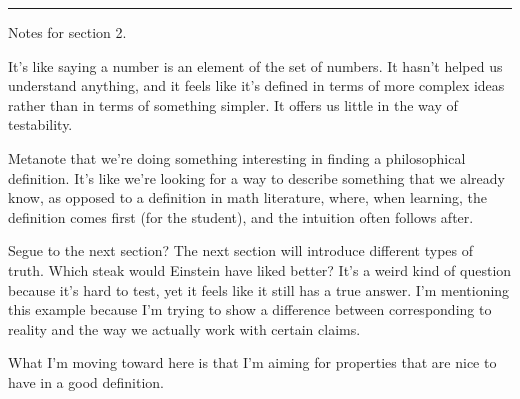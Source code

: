 \documentclass[11pt, oneside]{article}   	%
\newcommand\hr{\bigskip\hrule\bigskip}
\begin{document}

%
%

\hr

Notes for section 2.

It's like saying a number is an element of the set of numbers.
It hasn't helped us understand anything, and it feels like it's
defined in terms of more complex ideas rather than in terms of
something simpler. It offers us little in the way of testability.

Metanote that we're doing something interesting in finding a philosophical
definition. It's like we're looking for a way to describe something that
we already know, as opposed to a definition in math literature, where, when
learning, the definition comes first (for the student), and the intuition often
follows after.

Segue to the next section? The next section will introduce different types of
truth. Which steak would Einstein have liked better? It's a weird kind of
question because it's hard to test, yet it feels like it still has a true
answer. I'm mentioning this example because I'm trying to show a difference
between corresponding to reality and the way we actually work with certain
claims.

What I'm moving toward here is that I'm aiming for properties that are nice to
have in a good definition.
\end{document}
